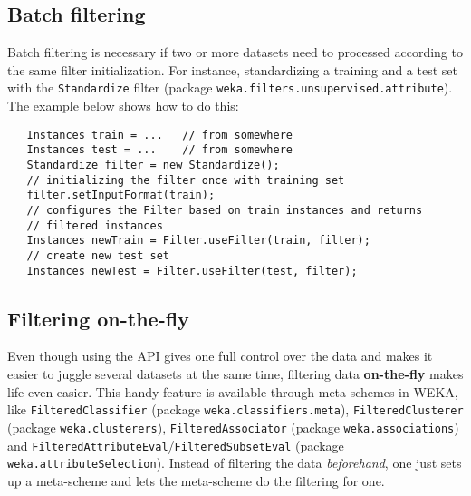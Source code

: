\subsection{Batch filtering}
Batch filtering is necessary if two or more datasets need to processed
according to the same filter initialization. For instance, standardizing a
training and a test set with the \texttt{Standardize} filter (package
\texttt{weka.filters.unsupervised.attribute}). The example below shows how to
do this:
\begin{verbatim}
   Instances train = ...   // from somewhere
   Instances test = ...    // from somewhere
   Standardize filter = new Standardize();
   // initializing the filter once with training set
   filter.setInputFormat(train);
   // configures the Filter based on train instances and returns
   // filtered instances
   Instances newTrain = Filter.useFilter(train, filter);
   // create new test set
   Instances newTest = Filter.useFilter(test, filter);
\end{verbatim}

\subsection{Filtering on-the-fly}
\label{api_filtering_onthefly}
Even though using the API gives one full control over the data and makes it
easier to juggle several datasets at the same time, filtering data
\textbf{on-the-fly} makes life even easier. This handy feature is available
through meta schemes in WEKA, like \texttt{FilteredClassifier} (package
\texttt{weka.classifiers.meta}), \texttt{FilteredClusterer} (package
\texttt{weka.clusterers}), \texttt{FilteredAssociator} (package
\texttt{weka.associations}) and
\texttt{FilteredAttributeEval}/\texttt{FilteredSubsetEval} (package
\texttt{weka.attributeSelection}). Instead of filtering the data
\textit{beforehand}, one just sets up a meta-scheme and lets the meta-scheme
do the filtering for one.

\newpage


